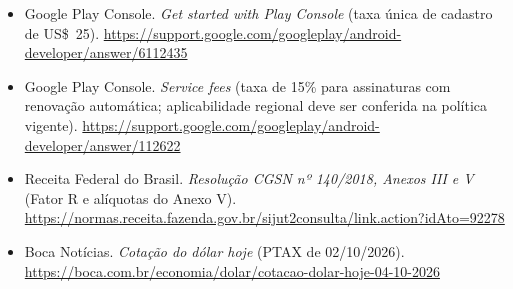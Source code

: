 \begin{itemize}[leftmargin=1.2em, itemsep=4pt]
  \item Google Play Console. \emph{Get started with Play Console} (taxa única de cadastro de
  US\$~25). \url{https://support.google.com/googleplay/android-developer/answer/6112435}
  \item Google Play Console. \emph{Service fees} (taxa de 15\% para assinaturas com renovação
  automática; aplicabilidade regional deve ser conferida na política vigente).
  \url{https://support.google.com/googleplay/android-developer/answer/112622}
  \item Receita Federal do Brasil. \emph{Resolução CGSN nº 140/2018, Anexos III e V} (Fator R
  e alíquotas do Anexo V). \url{https://normas.receita.fazenda.gov.br/sijut2consulta/link.action?idAto=92278}
  \item Boca Notícias. \emph{Cotação do dólar hoje} (PTAX de 02/10/2026).
  \url{https://boca.com.br/economia/dolar/cotacao-dolar-hoje-04-10-2026}
\end{itemize}